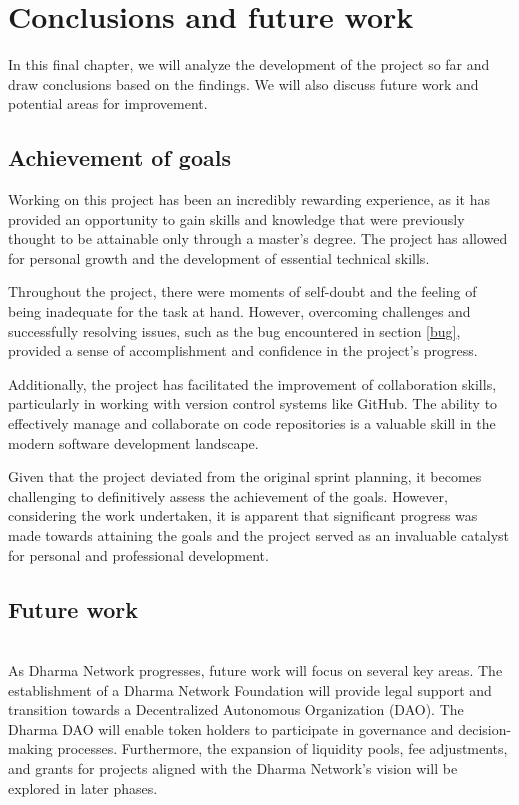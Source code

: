 \chapter{Conclusions and future work} \label{chap:chap6}

In this final chapter, we will analyze the development of the project so far and draw conclusions based on the findings. We will also discuss future work and potential areas for improvement.

\section{Achievement of goals}

Working on this project has been an incredibly rewarding experience, as it has provided an opportunity to gain skills and knowledge that were previously thought to be attainable only through a master's degree. The project has allowed for personal growth and the development of essential technical skills.\newline

Throughout the project, there were moments of self-doubt and the feeling of being inadequate for the task at hand. However, overcoming challenges and successfully resolving issues, such as the bug encountered in section \ref{bug}, provided a sense of accomplishment and confidence in the project's progress.\newline

Additionally, the project has facilitated the improvement of collaboration skills, particularly in working with version control systems like GitHub. The ability to effectively manage and collaborate on code repositories is a valuable skill in the modern software development landscape.\newline

Given that the project deviated from the original sprint planning, it becomes challenging to definitively assess the achievement of the goals. However, considering the work undertaken, it is apparent that significant progress was made towards attaining the goals and the project served as an invaluable catalyst for personal and professional development.\newline

\section{Future work}

\\As Dharma Network progresses, future work will focus on several key areas. The establishment of a Dharma Network Foundation will provide legal support and transition towards a Decentralized Autonomous Organization (DAO). The Dharma DAO will enable token holders to participate in governance and decision-making processes. Furthermore, the expansion of liquidity pools, fee adjustments, and grants for projects aligned with the Dharma Network's vision will be explored in later phases.\\


